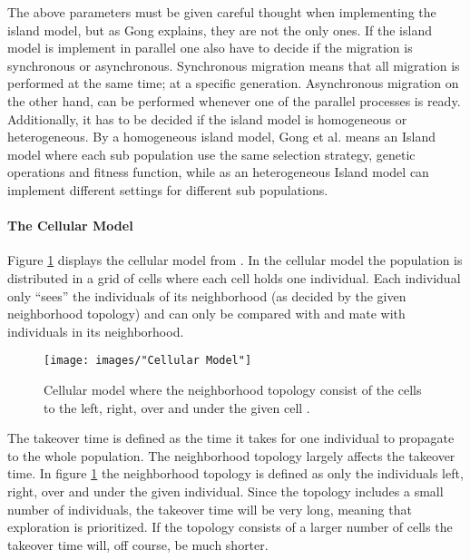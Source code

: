 \noindent The above parameters must be given careful thought when implementing the island model, but as Gong explains, they are not the only ones. If the island model is implement in parallel one also have to decide if the migration is synchronous or asynchronous. Synchronous migration means that all migration is performed at the same time; at a specific generation. Asynchronous migration on the other hand, can be performed whenever one of the parallel processes is ready. Additionally, it has to be decided if the island model is homogeneous or heterogeneous. By a homogeneous island model, Gong et al. means an Island model where each sub population use the same selection strategy, genetic operations and fitness function, while as an heterogeneous Island model can implement different settings for different sub populations.


\paragraph*{The Cellular Model}
Figure \ref{Cellular model} displays the cellular model from \cite{Gong}. In the cellular model the population is distributed in a grid of cells where each cell holds one individual. Each individual only ``sees'' the individuals of its neighborhood (as decided by the given neighborhood topology) and can only be compared with and mate with individuals in its neighborhood. \\


\begin{figure}[h!]
\begin{center}
\texttt{[image: images/"Cellular Model"]}
\caption{Cellular model where the neighborhood topology consist of the cells to the left, right, over and under the given cell \citep{Gong}.}
\label{Cellular model}
\end{center}
\end{figure}


\noindent The takeover time is defined as the time it takes for one individual to propagate to the whole population. The neighborhood topology largely affects the takeover time. In figure \ref{Cellular model} the neighborhood topology is defined as only the individuals left, right, over and under the given individual. Since the topology includes a small number of individuals, the takeover time will be very long, meaning that exploration is prioritized. If the topology consists of a larger number of cells the takeover time will, off course, be much shorter.\\


